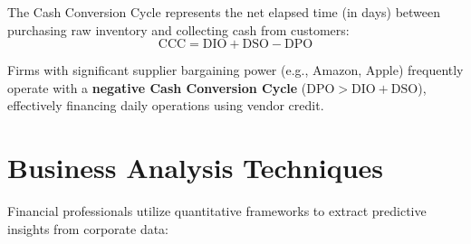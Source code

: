 \documentclass[11pt,a4paper]{article}
\begin{document}
\begin{formulabox}
The Cash Conversion Cycle represents the net elapsed time (in days) between purchasing raw inventory and collecting cash from customers:
\begin{equation}
\text{CCC} = \text{DIO} + \text{DSO} - \text{DPO}
\end{equation}
\end{formulabox}

\begin{keyconcept}
Firms with significant supplier bargaining power (e.g., Amazon, Apple) frequently operate with a \textbf{negative Cash Conversion Cycle} ($\text{DPO} > \text{DIO} + \text{DSO}$), effectively financing daily operations using vendor credit.
\end{keyconcept}

\section{Business Analysis Techniques}
\label{sec:analysis-techniques}

Financial professionals utilize quantitative frameworks to extract predictive insights from corporate data:
\end{document}
